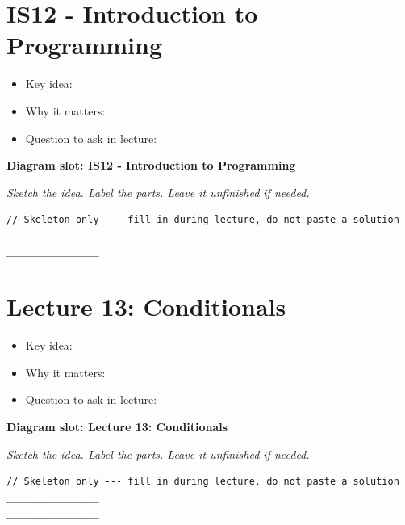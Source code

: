 \documentclass[12pt]{article}
\begin{document}
\section{IS12 - Introduction to Programming}
\begin{itemize}[leftmargin=*]
  \item Key idea: \hrulefill
  \vspace{1.1em}
  \item Why it matters: \hrulefill
  \vspace{1.1em}
  \item Question to ask in lecture: \hrulefill
\end{itemize}
\noindent\textbf{Diagram slot: IS12 - Introduction to Programming}
\begin{framed}
\begin{minipage}[t][0.22\textheight]{\textwidth}
\vspace{0.4em}
\textit{Sketch the idea. Label the parts. Leave it unfinished if needed.}
\end{minipage}
\end{framed}
\vspace{1em}
\begin{lstlisting}
// Skeleton only --- fill in during lecture, do not paste a solution
________________
________________
\end{lstlisting}
\vspace{1em}
\section{Lecture 13: Conditionals}
\begin{itemize}[leftmargin=*]
  \item Key idea: \hrulefill
  \vspace{1.1em}
  \item Why it matters: \hrulefill
  \vspace{1.1em}
  \item Question to ask in lecture: \hrulefill
\end{itemize}
\noindent\textbf{Diagram slot: Lecture 13: Conditionals}
\begin{framed}
\begin{minipage}[t][0.22\textheight]{\textwidth}
\vspace{0.4em}
\textit{Sketch the idea. Label the parts. Leave it unfinished if needed.}
\end{minipage}
\end{framed}
\vspace{1em}
\begin{lstlisting}
// Skeleton only --- fill in during lecture, do not paste a solution
________________
________________
\end{lstlisting}
\vspace{1em}
\end{document}
